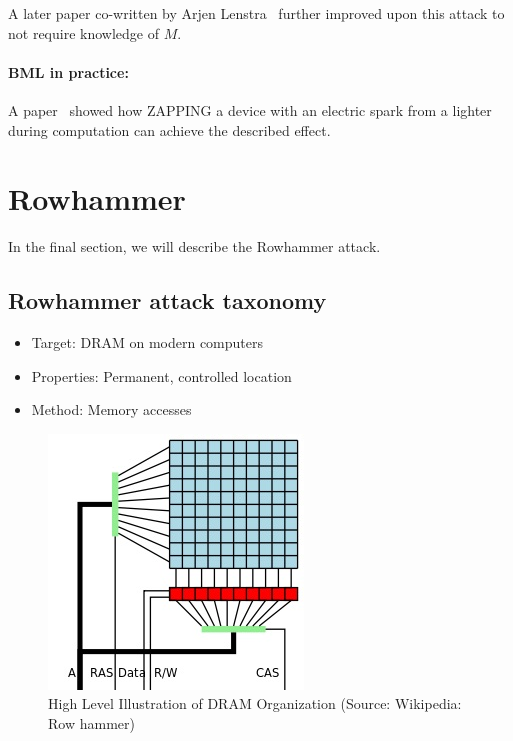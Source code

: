 A later paper co-written by Arjen Lenstra~\cite{lenstra} further improved upon
this attack to not require knowledge of \(M\).

\paragraph{BML in practice:} A paper~\cite{schmidt} showed how ZAPPING a device
with an electric spark from a lighter during computation can achieve the
described effect.

\section{Rowhammer}\label{sec:rowhammer}
In the final section, we will describe the Rowhammer attack.
\subsection{Rowhammer attack taxonomy}\label{subsec:rowhammer_attack_taxonomy}
	\begin{itemize}
		\item Target: DRAM on modern computers
		\item Properties: Permanent, controlled location
		\item Method: Memory accesses
	\end{itemize}

\begin{figure}[!ht]
	\centering
	\includegraphics[width=0.5\linewidth]{images/chapter_9/DRAM.jpg}
	\caption{High Level Illustration of DRAM Organization (Source: Wikipedia: Row hammer)}\label{fig:dram_svg}
\end{figure}

